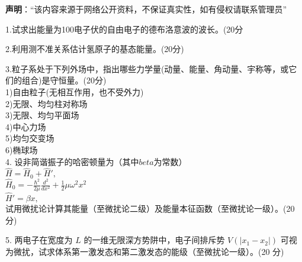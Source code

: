
\textbf{声明}：“该内容来源于网络公开资料，不保证真实性，如有侵权请联系管理员”

1.试求出能量为100电子伏的自由电子的德布洛意波的波长。(20分

2.利用测不准关系估计氢原子的基态能量。(20分)

3.粒子系处于下列外场中，指出哪些力学量(动量、能量、角动量、宇称等，或它们的组合)是守恒量。(20分)\\
1)自由粒子(无相互作用，也不受外力)\\
2)无限、均匀柱对称场\\
3)无限、均匀平面场\\
4)中心力场\\
5)均匀交变场\\
6)椭球场\\

4. 设非简谐振子的哈密顿量为（其中$beta$为常数）\\
$\hat{H} = \hat{H}_0 + \hat{H}',$\\
$\hat{H}_0 = -\frac{\hbar^2}{2\mu} \frac{d^2}{dx^2} + \frac{1}{2} \mu \omega^2 x^2$\\
$\hat{H}' = \beta x,$\\

试用微扰论计算其能量（至微扰论二级）及能量本征函数（至微扰论一级）。(20 分)

5. 两电子在宽度为 $L$ 的一维无限深方势阱中，电子间排斥势 $V(|x_1-x_2|)$ 可视为微扰，试求体系第一激发态和第二激发态的能级（至微扰论一级）。(20 分)

